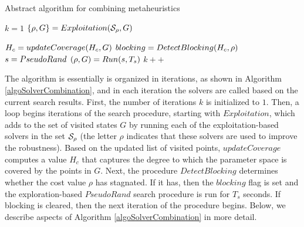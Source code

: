 \begin{algorithm}
\caption{Abstract algorithm for combining metaheuristics \label{algoSolverCombination}}
\begin{algorithmic}
\State {}
\State {}
\State {}
\State {}
\State

\State $k= 1$
		\State {}
  		\State $\{ \rho, G \} = Exploitation(\mathcal{S_{\rho}}, G)$ 	 
	 
         \State
\State $H_c = updateCoverage(H_c,  G)$
\State
\State {}
\State $blocking =  DetectBlocking(H_c, \rho)$ 
	 \State $s = PseudoRand$
	 \State {}   
	 \State $(\rho, G)= Run(s, T_{s})$ 
 \EndIf	
 \State        
\State $k++$
\EndWhile
\end{algorithmic}
\end{algorithm}

The algorithm is essentially is organized in iterations, as shown in Algorithm \ref{algoSolverCombination}, and in each iteration the solvers are called based on the current search results. First, the number of iterations $k$ is initialized to $1$. Then, a loop begins iterations of the search procedure, starting with $Exploitation$, which adds to the set of visited states $G$ by running each of the exploitation-based solvers in the set $\mathcal{S_{\rho}}$ (the letter $\rho$ indicates that these solvers are used to improve the robustness). Based on the updated list of visited points, $updateCoverage$ computes a value $H_c$ that captures the degree to which the parameter space is covered by the points in $G$.  Next, the procedure $DetectBlocking$ determines whether the cost value $\rho$ has stagnated. If it has, then the $blocking$ flag is set and the exploration-based $PseudoRand$ search procedure is run for $T_s$ seconds. If blocking is cleared, then the next iteration of the procedure begins. Below, we describe aspects of Algorithm \ref{algoSolverCombination} in more detail.

